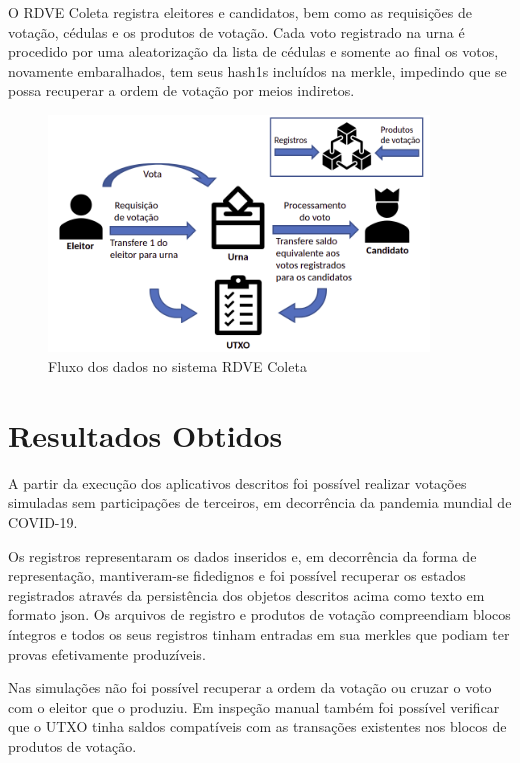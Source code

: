 O RDVE Coleta registra eleitores e candidatos, bem como as requisições de votação, cédulas e os produtos de votação. Cada voto registrado na urna é procedido por uma aleatorização da lista de cédulas e somente ao final os votos, novamente embaralhados, tem seus \glspl{hash1} incluídos na \gls{merkle}, impedindo que se possa recuperar a ordem de votação por meios indiretos. 

\clearpage

\begin{figure}[!h]
	\centering
	\includegraphics[width=0.9\textwidth]{imagens/fluxo_dados}
	\caption{Fluxo dos dados no sistema RDVE Coleta}
	\label{fig:fluxo_dados}
\end{figure}


\section{Resultados Obtidos}

A partir da execução dos aplicativos descritos foi possível realizar votações simuladas sem participações de terceiros, em decorrência da pandemia mundial de COVID-19.

Os registros representaram os dados inseridos e, em decorrência da forma de representação, mantiveram-se fidedignos e foi possível recuperar os estados registrados através da persistência dos objetos descritos acima como texto em formato \gls{json}. Os arquivos de registro e produtos de votação compreendiam blocos íntegros e todos os seus registros tinham entradas em sua \glspl{merkle} que podiam ter provas efetivamente produzíveis. 

Nas simulações não foi possível recuperar a ordem da votação ou cruzar o voto com o eleitor que o produziu. Em inspeção manual também foi possível verificar que o UTXO tinha saldos compatíveis com as transações existentes nos blocos de produtos de votação. 
